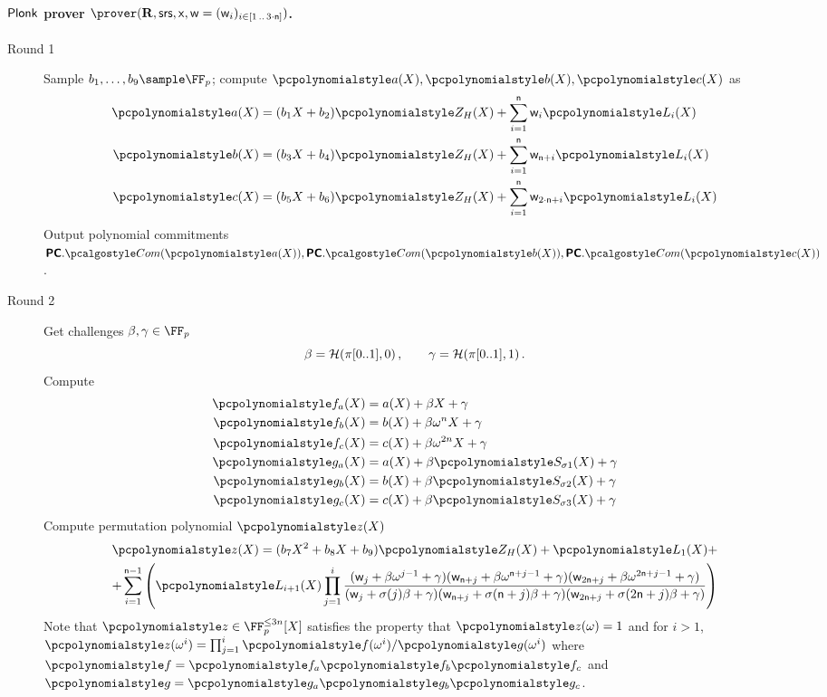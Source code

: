 \documentclass[runningheads,11pt]{llncs}
\begin{document}
\paragraph{$\textnormal{\textsf{Plonk}}$ prover
  $\prover(\REL, \srs, \inp, \wit = (\wit_i)_{i \in \range{1}{3 \cdot
      \noofc}})$.}
\begin{description}
\item[Round 1] Sample $b_1, \ldots, b_9 \sample \FF_p$; compute
  $\p{a}(X), \p{b}(X), \p{c}(X)$ as
	\begin{align*}
		\p{a}(X) &= (b_1 X + b_2)\p{Z_H}(X) + \sum_{i = 1}^{\noofc} \wit_i \lag_i(X) \\
		\p{b}(X) &= (b_3 X + b_4)\p{Z_H}(X) + \sum_{i = 1}^{\noofc} \wit_{\noofc + i} \lag_i(X) \\
		\p{c}(X) &= (b_5 X + b_6)\p{Z_H}(X) + \sum_{i = 1}^{\noofc} \wit_{2 \cdot \noofc + i} \lag_i(X) 
	\end{align*}
	Output polynomial commitments $\PCOM.\com(\p{a}(X)), \PCOM.\com(\p{b}(X)), \PCOM.\com(\p{c}(X))$.
	
	\item[Round 2]
	Get challenges $\beta, \gamma \in \FF_p$
	\[
		\beta = \mathcal{H}(\pi[0..1], 0)\,, \qquad \gamma = \mathcal{H}(\pi[0..1], 1)\,.
        \]
        Compute
        \begin{align*}
          \p{f_{a}}(X) & = a(X) + \beta X + \gamma \\
          \p{f_{b}}(X) & = b(X) + \beta \omega^{n} X + \gamma \\
          \p{f_{c}}(X) & = c(X) + \beta \omega^{2n} X + \gamma \\
          \p{g_{a}}(X) & = a(X) + \beta \p{S_{\sigma 1}}(X) + \gamma \\
          \p{g_{b}}(X) & = b(X) + \beta \p{S_{\sigma 2}}(X) + \gamma \\
          \p{g_{c}}(X) & = c(X) + \beta \p{S_{\sigma 3}}(X) + \gamma \\
        \end{align*}
	Compute permutation polynomial $\p{z}(X)$
	\begin{multline*}
		\p{z}(X) = (b_7 X^2 + b_8 X + b_9)\p{Z_H}(X) + \lag_1(X) + \\
			+ \sum_{i = 1}^{\noofc - 1} 
			\left(\lag_{i + 1} (X) \prod_{j = 1}^{i} 
			\frac{
			(\wit_j +\beta \omega^{j - 1} + \gamma)(\wit_{\noofc + j} + \beta
      \omega^{\noofc + j - 1} + \gamma)(\wit_{2 \noofc + j} +\beta \omega^{2
        \noofc + j- 1} + \gamma)}
			{(\wit_j+\sigma(j) \beta + \gamma)(\wit_{\noofc + j} + \sigma(\noofc + j)\beta + \gamma)(\wit_{2 \noofc + j} + \sigma(2 \noofc + j)\beta + \gamma)}\right)
	\end{multline*}
  Note that $\p{z}\in \FF_{p}^{\leq 3n}[X]$ satisfies the property that
  $\p{z}(\omega)=1$ and for $i > 1$,
  $\p{z}(\omega^{i}) = \prod_{j=1}^{i} \p{f}(\omega^{i})/\p{g}(\omega^{i})$
  where $\p{f} = \p{f_{a}}\p{f_{b}}\p{f_{c}}$ and
  $\p{g} = \p{g_{a}}\p{g_{b}}\p{g_{c}}$.


\end{description}
\end{document}
